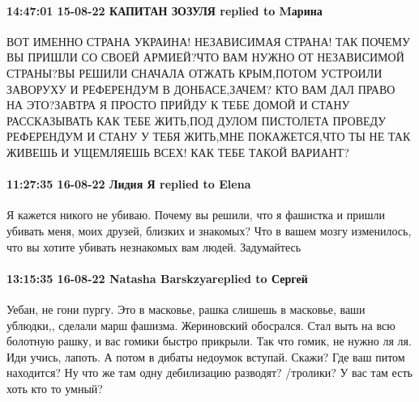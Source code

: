  
 
 
 
 

\paragraph{14:47:01 15-08-22 КАПИТАН ЗОЗУЛЯ replied to Mарина}

ВОТ ИМЕННО СТРАНА УКРАИНА! НЕЗАВИСИМАЯ СТРАНА! ТАК ПОЧЕМУ ВЫ ПРИШЛИ СО СВОЕЙ
АРМИЕЙ?ЧТО ВАМ НУЖНО ОТ НЕЗАВИСИМОЙ СТРАНЫ?ВЫ РЕШИЛИ СНАЧАЛА ОТЖАТЬ КРЫМ,ПОТОМ
УСТРОИЛИ ЗАВОРУХУ И РЕФЕРЕНДУМ В ДОНБАСЕ,ЗАЧЕМ? КТО ВАМ ДАЛ ПРАВО НА ЭТО?ЗАВТРА
Я ПРОСТО ПРИЙДУ К ТЕБЕ ДОМОЙ И СТАНУ РАССКАЗЫВАТЬ КАК ТЕБЕ ЖИТЬ,ПОД ДУЛОМ
ПИСТОЛЕТА ПРОВЕДУ РЕФЕРЕНДУМ И СТАНУ У ТЕБЯ ЖИТЬ,МНЕ ПОКАЖЕТСЯ,ЧТО ТЫ НЕ ТАК
ЖИВЕШЬ И УЩЕМЛЯЕШЬ ВСЕХ! КАК ТЕБЕ ТАКОЙ ВАРИАНТ?

\paragraph{11:27:35 16-08-22 Лидия Я replied to Elena}

Я кажется никого не убиваю. Почему вы решили, что я фашистка и пришли убивать
меня, моих друзей, близких и знакомых? Что в вашем мозгу изменилось, что вы
хотите убивать незнакомых вам людей. Задумайтесь

\paragraph{13:15:35 16-08-22 Natasha Barskzyareplied to Сергей}

Уебан, не гони пургу. Это в масковье, рашка слишешь в масковье, ваши ублюдки,,
сделали марш фашизма. Жериновский обосрался. Стал выть на всю болотную рашку, и
вас гомики быстро прикрыли. Так что гомик, не нужно ля ля. Иди учись, лапоть. А
потом в дибаты недоумок вступай. Скажи? Где ваш питом находится? Ну что же там
одну дебилизацию разводят? /тролики? У вас там есть хоть кто то умный?

